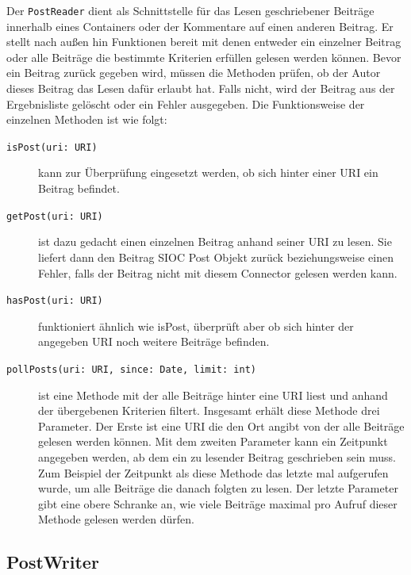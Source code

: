 Der \texttt{PostReader} dient als Schnittstelle für das Lesen geschriebener Beiträge innerhalb eines Containers oder der Kommentare auf einen anderen Beitrag. Er stellt nach außen hin Funktionen bereit mit denen entweder ein einzelner Beitrag oder alle Beiträge die bestimmte Kriterien erfüllen gelesen werden können. Bevor ein Beitrag zurück gegeben wird, müssen die Methoden prüfen, ob der Autor dieses Beitrag das Lesen dafür erlaubt hat. Falls nicht, wird der Beitrag aus der Ergebnisliste gelöscht oder ein Fehler ausgegeben. Die Funktionsweise der einzelnen Methoden ist wie folgt:

\begin{description}
    \item[\texttt{isPost(uri: URI)}] kann zur Überprüfung eingesetzt werden, ob sich hinter einer URI ein Beitrag befindet.

    \item[\texttt{getPost(uri: URI)}] ist dazu gedacht einen einzelnen Beitrag anhand seiner URI zu lesen. Sie liefert dann den Beitrag SIOC Post Objekt zurück beziehungsweise einen Fehler, falls der Beitrag nicht mit diesem Connector gelesen werden kann.

    \item[\texttt{hasPost(uri: URI)}] funktioniert ähnlich wie isPost, überprüft aber ob sich hinter der angegeben URI noch weitere Beiträge befinden. 

    \item[\texttt{pollPosts(uri: URI, since: Date, limit: int)}] ist eine Methode mit der alle Beiträge hinter eine URI liest und anhand der übergebenen Kriterien filtert.  Insgesamt erhält diese Methode drei Parameter. Der Erste ist eine URI die den Ort angibt von der alle Beiträge gelesen werden können. Mit dem zweiten Parameter kann ein Zeitpunkt angegeben werden, ab dem ein zu lesender Beitrag geschrieben sein muss. Zum Beispiel der Zeitpunkt als diese Methode das letzte mal aufgerufen wurde, um alle Beiträge die danach folgten zu lesen. Der letzte Parameter gibt eine obere Schranke an, wie viele Beiträge maximal pro Aufruf dieser Methode gelesen werden dürfen. 
\end{description}


\subsection{PostWriter} %
\label{sub:postwriter}

